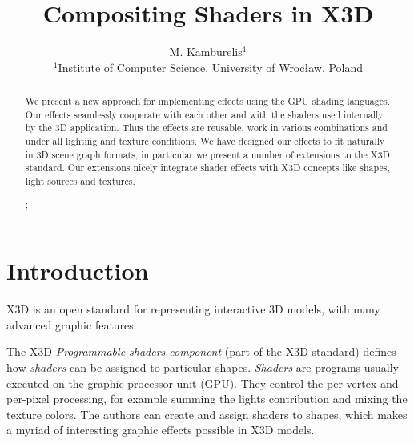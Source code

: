 \documentclass{egpubl}
\title{Compositing Shaders in X3D}
\author[M. Kamburelis]{M. Kamburelis$^{1}$\\
  $^1$Institute of Computer Science, University of Wroc{\l}aw, Poland}
\begin{document}

\maketitle

\begin{abstract}
We present a new approach for implementing effects using the GPU shading languages.
Our effects seamlessly cooperate with each other and with
the shaders used internally by the 3D application.
Thus the effects are reusable, work in various combinations
and under all lighting and texture conditions.
We have designed our effects to fit naturally in 3D scene graph formats,
in particular we present a number of extensions to the X3D standard.
Our extensions nicely integrate shader effects with X3D
concepts like shapes, light sources and textures.


\begin{classification}
  ;
\end{classification}

\end{abstract}


\section{Introduction}


X3D \cite{x3d:spec} is an open standard for representing interactive 3D models,
with many advanced graphic features.

The X3D \textit{Programmable shaders component} \cite{x3d:shaders}
(part of the X3D standard) defines how \emph{shaders} can be assigned
to particular shapes. %
\emph{Shaders} are programs usually executed on the graphic processor unit
(GPU). They control the per-vertex and per-pixel processing,
for example summing the lights contribution
and mixing the texture colors. The authors
can create and assign shaders to shapes, which makes
a myriad of interesting graphic effects possible in X3D models.
\end{document}
